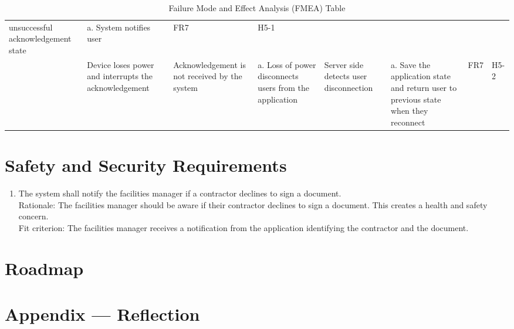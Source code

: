 \documentclass{article}
\begin{document}
\begin{table}
{\begin{tabular}{|>{\raggedright}p{2.0cm}|>{\raggedright}p{2.0cm}|>{\raggedright}p{2.5cm}|>{\raggedright}p{4cm}|>{\raggedright}p{3cm}|>{\raggedright}p{4cm}|>{\raggedright}p{1.5cm}|p{1.5cm}|}
      unsuccessful acknowledgement state & a. System notifies user &
      FR7 & H5-1 \\
      \cline{2-8}
      & Device loses power and interrupts the acknowledgement & Acknowledgement
      is not received by the system &
      a. Loss of power disconnects users from the application & Server side
      detects user disconnection & a. Save the application state and return
      user to previous state when they reconnect & FR7 & H5-2 \\
      \hline
    \end{tabular}
  }
  \caption{Failure Mode and Effect Analysis (FMEA) Table}
\end{table}

\section{Safety and Security Requirements}

\begin{enumerate}[{SFR}1.]
  \item The system shall notify the facilities manager if a contractor declines
    to sign a document.\\
    \newline Rationale: The facilities manager should be aware if
    their contractor
    declines to sign a document. This creates a health and safety concern.\\
    \newline Fit criterion: The facilities manager receives a
    notification from the
    application identifying the contractor and the document.
\end{enumerate}

\section{Roadmap}


\newpage{}

\section*{Appendix --- Reflection}


\end{document}

